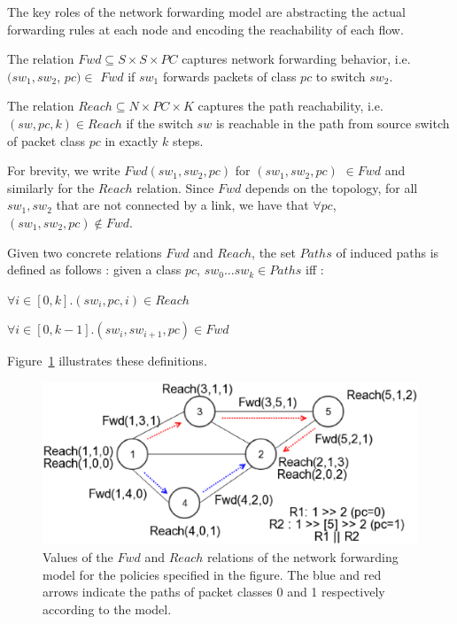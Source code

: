 The key roles of the network forwarding model are abstracting the actual forwarding rules at each node and encoding the reachability of each flow. 
\begin{mydef}
\label{def:fwd}
The relation $Fwd \subseteq S \times S \times PC $ captures network forwarding behavior, i.e. 
$(sw_1, sw_2$, $pc)\in$ $Fwd$ if 
$sw_1$ forwards packets of class $pc$ to switch $sw_2$. 
\end{mydef}
\begin{mydef}
\label{def:reach}
	The relation $Reach \subseteq N \times PC \times K$ captures the path reachability,
	i.e. $(sw, pc, k)\in Reach$ if 
	the switch $sw$ is reachable in the path from source switch of packet class $pc$ in exactly $k$ steps.  
\end{mydef}
For brevity, we write $Fwd(sw_1, sw_2, pc)$ for $(sw_1, sw_2, pc) $ $\in Fwd$ and similarly for the $Reach$ relation. 
Since $Fwd$ depends on the topology,
for all $sw_1, sw_2$ that are not connected by a link, 
we have that $\forall pc$, $(sw_1,sw_2,pc) \notin Fwd$. 

\begin{mydef}
Given two concrete relations $Fwd$ and $Reach$, 
the set $Paths$ of induced paths is defined as follows :
given a class $pc$,  $sw_0 \ldots sw_k \in Paths$ iff : 
\begin{compactenumerate}
	\item $\forall i \in [0,k]. (sw_i, pc, i) \in Reach$
	\item $\forall i \in [0, k - 1]. (sw_i, sw_{i+1}, pc) \in Fwd$
\end{compactenumerate}
\end{mydef}
\noindent Figure~\ref{fig:model} illustrates these definitions.

\begin{figure}[!thb]
	\centering
	\includegraphics[width=0.8\columnwidth]{figures/network-model-example.eps}
	\caption{Values of the $Fwd$ and $Reach$ relations of the network forwarding model
		 for the policies specified in the figure. The blue and red arrows indicate the 
		 paths of packet classes 0 and 1 respectively according to the model.}
	\label{fig:model}
\end{figure}

